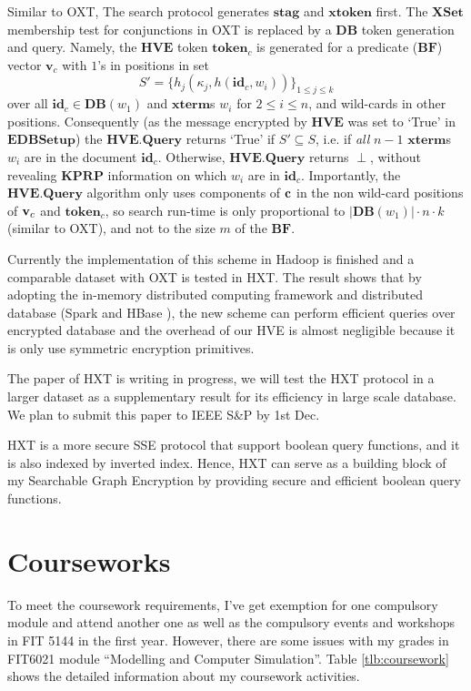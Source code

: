 Similar to OXT, The search protocol generates $\mathbf{stag}$ and $\mathbf{xtoken}$ first. The $\mathbf{XSet}$ membership test for conjunctions in OXT is replaced by a $\mathbf{DB}$ token generation and query. Namely, the $\mathbf{HVE}$ token $\mathbf{token}_c$ is generated for a predicate ($\mathbf{BF}$) vector $\mathbf{v}_c$ with $1$'s in positions in set 
$$S' = \{h_j(\kappa_j,h(\mathbf{id}_c,w_i))\}_{1\leq j\leq k}$$
over all $\mathbf{id}_c \in \mathbf{DB}(w_1)$ and $\mathbf{xterm}$s $w_i$ for $2\leq i\leq n$, and wild-cards in other positions. Consequently (as the message encrypted by $\mathbf{HVE}$ was set to `True' in $\mathbf{EDBSetup}$) the $\mathbf{HVE.Query}$ returns `True' if $S' \subseteq S$, i.e. if \emph{all} $n-1$ $\mathbf{xterm}$s $w_i$ are in the document $\mathbf{id}_c$. Otherwise, $\mathbf{HVE.Query}$ returns $\perp$, without revealing $\mathbf{KPRP}$ information on which $w_i$ are in $\mathbf{id}_c$. Importantly, the $\mathbf{HVE.Query}$ algorithm only uses components of ${\bf c}$ in the non wild-card positions of ${\bf v}_c$ and $\mathbf{token}_c$, so search run-time is only proportional to $|\mathbf{DB}(w_1)| \cdot n \cdot k$ (similar to OXT), and not to the size $m$ of the $\mathbf{BF}$.

Currently the implementation of this scheme in Hadoop is finished and a comparable dataset with OXT is tested in HXT. The result shows that by adopting the in-memory distributed computing framework and distributed database (Spark \cite{apache2017spark} and HBase \cite{apache2017hbase}), the new scheme can perform efficient queries over encrypted database and the overhead of our HVE is almost negligible because it is only use symmetric encryption primitives. 

The paper of HXT is writing in progress, we will test the HXT protocol in a larger dataset as a supplementary result for its efficiency in large scale database. We plan to submit this paper to IEEE S\&P by 1st Dec.

HXT is a more secure SSE protocol that support boolean query functions, and it is also indexed by inverted index. Hence, HXT can serve as a building block of my Searchable Graph Encryption by providing secure and efficient boolean query functions.

\section{Courseworks}
To meet the coursework requirements, I've get exemption for one compulsory module and attend another one as well as the compulsory events and workshops in FIT 5144 in the first year. However, there are some issues with my grades in FIT6021 module ``Modelling and Computer Simulation''. Table \ref{tlb:coursework} shows the detailed information about my coursework activities. 

